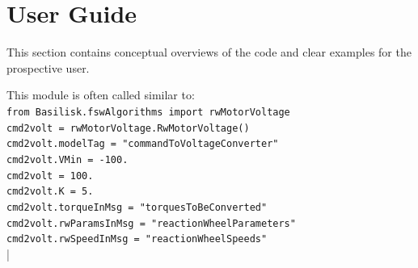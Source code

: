 \section{User Guide}
This section contains conceptual overviews of the code and clear examples for the prospective user.

This module is often called similar to:\\
\verb|from Basilisk.fswAlgorithms import rwMotorVoltage|\\
\verb|cmd2volt = rwMotorVoltage.RwMotorVoltage()|\\
\verb|cmd2volt.modelTag = "commandToVoltageConverter"|\\
\verb|cmd2volt.VMin = -100.|\\
\verb|cmd2volt = 100.|\\
\verb|cmd2volt.K = 5.|\\
\verb|cmd2volt.torqueInMsg = "torquesToBeConverted"|\\
\verb|cmd2volt.rwParamsInMsg = "reactionWheelParameters"|\\
\verb|cmd2volt.rwSpeedInMsg = "reactionWheelSpeeds"|\\


|
